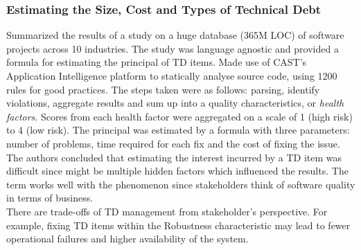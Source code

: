 \documentclass{mprop}
\begin{document}
\subsubsection{Estimating the Size, Cost and Types of Technical Debt}
\cite{Curtis2012} Summarized the results of a study on a huge database (365M
LOC) of software projects across 10 industries. The study was language agnostic
and provided a formula for estimating the principal of TD items. Made use of
CAST's Application Intelligence platform to statically analyse source code,
using 1200 rules for good practices. The steps taken were as follows: parsing,
identify violations, aggregate results and sum up into a quality
characteristics, or \textit{health factors}. Scores from each health factor were
aggregated on a scale of 1 (high risk) to 4 (low risk). The principal was
estimated by a formula with three parameters: number of problems, time required
for each fix and the cost of fixing the issue. The authors concluded that
estimating the interest incurred by a TD item was difficult since might be
multiple hidden factors which influenced the results. The term works well with
the phenomenon since stakeholders think of software quality in terms of
business. \\
There are trade-offs of TD management from stakeholder's perspective. For
example, fixing TD items within the Robustness characteristic may lead to fewer
operational failures and higher availability of the system.
\end{document}
